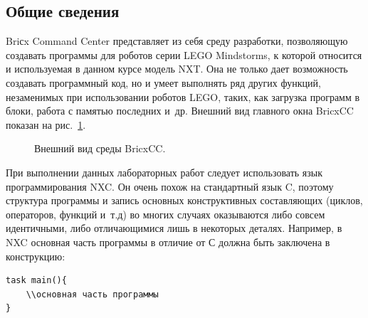 \documentclass[12pt,a4paper,openany]{extarticle}
\begin{document}
\subsection{Общие сведения}
\hspace*{\parindent}Briсx Command Center представляет из себя среду разработки, позволяющую создавать программы для роботов серии LEGO Mindstorms, к которой относится и используемая в данном курсе модель NXT. 
Она не только дает возможность создавать программный код, но и умеет выполнять ряд других функций, незаменимых при использовании роботов LEGO, таких, как загрузка программ в блоки, работа с памятью последних и~др. 
Внешний вид главного окна BricxCC показан на рис.~\ref{bricxcc}.

\begin{figure}[h]
	\noindent{}
	\caption{Внешний вид среды BricxCC.}
	\label{bricxcc}
\end{figure}

При выполнении данных лабораторных работ следует использовать язык программирования NXC. 
Он очень похож на стандартный язык C, поэтому структура программы и запись основных конструктивных составляющих (циклов, операторов, функций и~т.д) во многих случаях  оказываются либо совсем идентичными, либо отличающимися лишь в некоторых деталях. 
Например, в NXC основная часть программы в отличие от С должна быть заключена в конструкцию:
\begin{verbatim}
task main(){
    \\основная часть программы
}
\end{verbatim}     
\end{document}
